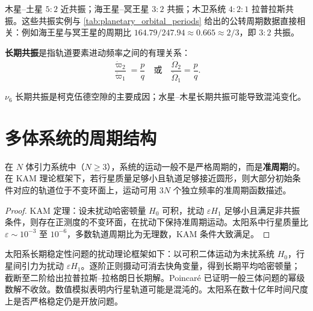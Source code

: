 \begin{example}[太阳系中的轨道共振]
木星--土星 \(5:2\) 近共振；海王星--冥王星 \(3:2\) 共振；木卫系统 \(4:2:1\) 拉普拉斯共振。这些共振实例与 \cref{tab:planetary_orbital_periods} 给出的公转周期数据直接相关：例如海王星与冥王星的周期比 $164.79/247.94\approx 0.665\approx 2/3$，即 $3:2$ 共振。
\end{example}

\begin{definition}[长期共振]\label{def:secular_resonance}
\textbf{长期共振}是指轨道要素进动频率之间的有理关系：
\[
\frac{\dot\varpi_2}{\dot\varpi_1}=\frac pq
\quad\text{或}\quad
\frac{\dot\Omega_2}{\dot\Omega_1}=\frac pq.
\]
\end{definition}

\begin{example}[太阳系中的长期共振]
\(\nu_6\) 长期共振是柯克伍德空隙的主要成因；水星--木星长期共振可能导致混沌变化。
\end{example}

\section{多体系统的周期结构}

\begin{theorem}[多体系统的准周期轨道]\label{thm:n_body_quasiperiodic}
在 \(N\) 体引力系统中（\(N\ge3\)），系统的运动一般不是严格周期的，而是\textbf{准周期}的。在 KAM 理论框架下，若行星质量足够小且轨道足够接近圆形，则大部分初始条件对应的轨道位于不变环面上，运动可用 \(3N\) 个独立频率的准周期函数描述。
\end{theorem}

\begin{proof}
KAM 定理：设未扰动哈密顿量 \(H_0\) 可积，扰动 \(\varepsilon H_1\) 足够小且满足非共振条件，则存在正测度的不变环面，在扰动下保持准周期运动。太阳系中行星质量比 \(\varepsilon\sim10^{-3}\) 至 \(10^{-6}\)，多数轨道周期比为无理数，KAM 条件大致满足。
\end{proof}

\begin{remark}\label{rem:solar_system_stability}
太阳系长期稳定性问题的扰动理论框架如下：以可积二体运动为未扰系统 \(H_0\)，行星间引力为扰动 \(\varepsilon H_1\)。逐阶正则摄动可消去快角变量，得到长期平均哈密顿量；截断至二阶给出拉普拉斯--拉格朗日长期解。Poincaré 已证明一般三体问题的幂级数解不收敛。数值模拟表明内行星轨道可能是混沌的。太阳系在数十亿年时间尺度上是否严格稳定仍是开放问题。
\end{remark}


